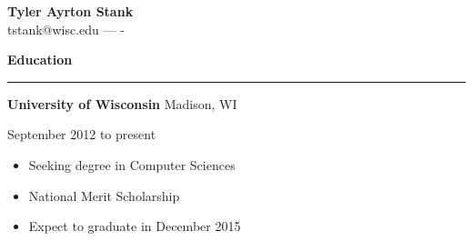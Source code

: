 \documentclass[12pt,letterpaper]{article}
\newenvironment{details}{
    \vspace{-.5em}
    \begin{itemize}
        \renewcommand \labelitemi{\labelitemiv}
        \setlength{\itemsep}{0pt}
        \setlength{\parskip}{-1pt}
        \setlength{\parsep}{0pt}
    }{
    \end{itemize}
    \vspace{-.5em}
}
\newcommand{\hr} {
    \vspace{-1em}
    \par\rule{\textwidth}{1pt}
    \vspace{-1.5em}
}
\newcommand{\ressection}[1] {
    \par{\large \textbf{#1}}
    \hr
}
\newenvironment{education} {
    \ressection{Education}
}{
    \vspace{0.5em}
}
\newcommand{\educator}[3] {
    \textbf{#1}
    \hfill #2
    \par #3
}
\begin{document}
\thispagestyle{empty}

\begin{flushright}
    {\large \textbf{Tyler Ayrton Stank}}\\
    tstank@wisc.edu ---  -
\end{flushright}

\begin{education}

\educator{University of Wisconsin}{Madison, WI}{September 2012 to present}
\begin{details}
    \item Seeking degree in Computer Sciences%
    \item National Merit Scholarship
    \item Expect to graduate in December 2015
\end{details}


\end{education}
\end{document}
